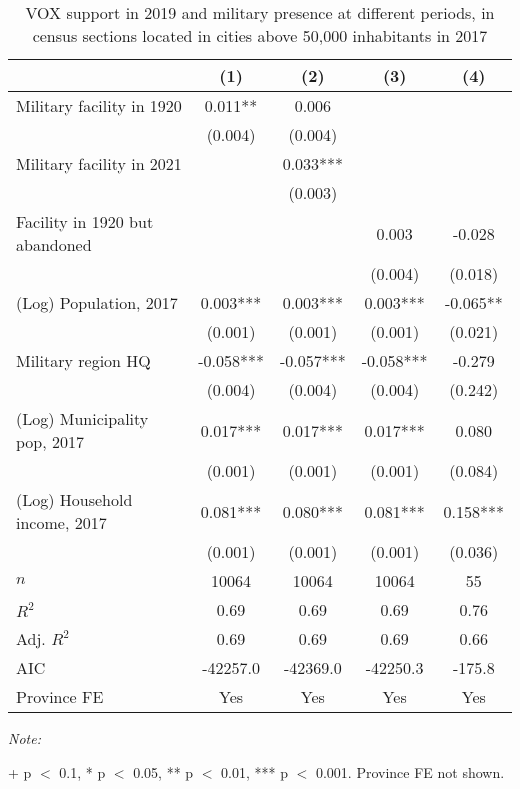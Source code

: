 \begin{table}[!h]

\caption{VOX support in 2019 and military presence at different periods, in census sections located in cities above 50,000 inhabitants in 2017\label{tab:lm\_vox\_c1920\_50k}}
\centering
\begin{threeparttable}
\begin{tabular}[t]{lcccc}
\toprule
  & (1) & (2) & (3) & (4)\\
\midrule
Military facility in 1920 & 0.011** & 0.006 &  & \\
 & (0.004) & (0.004) &  & \\
Military facility in 2021 &  & 0.033*** &  & \\
 &  & (0.003) &  & \\
Facility in 1920 but abandoned &  &  & 0.003 & -0.028\\
 &  &  & (0.004) & (0.018)\\
(Log) Population, 2017 & 0.003*** & 0.003*** & 0.003*** & -0.065**\\
 & (0.001) & (0.001) & (0.001) & (0.021)\\
Military region HQ & -0.058*** & -0.057*** & -0.058*** & -0.279\\
 & (0.004) & (0.004) & (0.004) & (0.242)\\
(Log) Municipality pop, 2017 & 0.017*** & 0.017*** & 0.017*** & 0.080\\
 & (0.001) & (0.001) & (0.001) & (0.084)\\
(Log) Household income, 2017 & 0.081*** & 0.080*** & 0.081*** & 0.158***\\
 & (0.001) & (0.001) & (0.001) & (0.036)\\
\midrule
$n$ & 10064 & 10064 & 10064 & 55\\
$R^2$ & 0.69 & 0.69 & 0.69 & 0.76\\
Adj. $R^2$ & 0.69 & 0.69 & 0.69 & 0.66\\
AIC & -42257.0 & -42369.0 & -42250.3 & -175.8\\
Province FE & Yes & Yes & Yes & Yes\\
\bottomrule
\end{tabular}
\begin{tablenotes}[para]
\item \textit{Note: } 
\item + p $<$ 0.1, * p $<$ 0.05, ** p $<$ 0.01, *** p $<$ 0.001. Province FE not shown.
\end{tablenotes}
\end{threeparttable}
\end{table}

